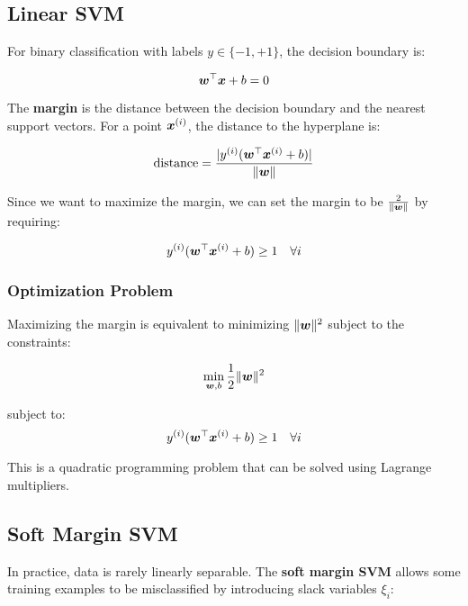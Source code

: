 \subsection{Linear SVM}

For binary classification with labels $y \in \{-1, +1\}$, the decision boundary is:

\begin{equation}
\boldsymbol{w}^\top \boldsymbol{x} + b = 0
\end{equation}

The \textbf{margin} is the distance between the decision boundary and the nearest support vectors. For a point $\boldsymbol{x}^{(i)}$, the distance to the hyperplane is:

\begin{equation}
\text{distance} = \frac{|y^{(i)}(\boldsymbol{w}^\top \boldsymbol{x}^{(i)} + b)|}{\|\boldsymbol{w}\|}
\end{equation}

Since we want to maximize the margin, we can set the margin to be $\frac{2}{\|\boldsymbol{w}\|}$ by requiring:

\begin{equation}
y^{(i)}(\boldsymbol{w}^\top \boldsymbol{x}^{(i)} + b) \geq 1 \quad \forall i
\end{equation}

\subsubsection{Optimization Problem}

Maximizing the margin is equivalent to minimizing $\|\boldsymbol{w}\|^2$ subject to the constraints:

\begin{equation}
\min_{\boldsymbol{w}, b} \frac{1}{2}\|\boldsymbol{w}\|^2
\end{equation}

subject to:
\begin{equation}
y^{(i)}(\boldsymbol{w}^\top \boldsymbol{x}^{(i)} + b) \geq 1 \quad \forall i
\end{equation}

This is a quadratic programming problem that can be solved using Lagrange multipliers.

\subsection{Soft Margin SVM}

In practice, data is rarely linearly separable. The \textbf{soft margin SVM} allows some training examples to be misclassified by introducing slack variables $\xi_i$:

